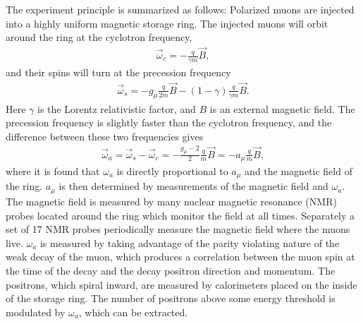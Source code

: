 \documentclass[12pt,letterpaper]{article}
\def\wa{$\omega_{a}$\xspace}
\def\amu{$a_{\mu}$\xspace}
\begin{document}


The experiment principle is summarized as follows: Polarized muons are injected into a highly uniform magnetic storage ring. The injected muons will orbit around the ring at the cyclotron frequency,
        \begin{align} \label{eq:wc}
            \vec{\omega}_{c} = -\frac{q}{\gamma m}\vec{B},
        \end{align} 
and their spins will turn at the precession frequency
        \begin{align} \label{eq:ws}
            \vec{\omega}_{s} = -g_{\mu}\frac{q}{2m}\vec{B} - (1-\gamma)\frac{q}{\gamma m}\vec{B}.
        \end{align}
Here $\gamma$ is the Lorentz relativistic factor, and $B$ is an external magnetic field. The precession frequency is slightly faster than the cyclotron frequency, and the difference between these two frequencies gives 
        \begin{align} \label{eq:wasimple}
            \vec{\omega}_{a} = \vec{\omega}_{s} - \vec{\omega}_{c} = -\frac{g_{\mu}-2}{2}\frac{q}{m}\vec{B} = - a_{\mu} \frac{q}{m}\vec{B},
        \end{align}
where it is found that \wa is directly proportional to \amu and the magnetic field of the ring. \amu is then determined by measurements of the magnetic field and \wa. The magnetic field is measured by many nuclear magnetic resonance (NMR) probes located around the ring which monitor the field at all times. Separately a set of 17 NMR probes periodically measure the magnetic field where the muons live. \wa is measured by taking advantage of the parity violating nature of the weak decay of the muon, which produces a correlation between the muon spin at the time of the decay and the decay positron direction and momentum. The positrons, which spiral inward, are measured by calorimeters placed on the inside of the storage ring. The number of positrons above some energy threshold is modulated by \wa, which can be extracted.
\end{document}
